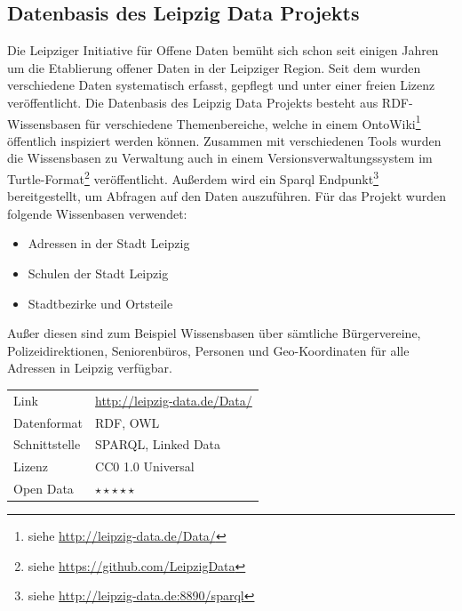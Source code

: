 \documentclass[parskip]{scrartcl}
\begin{document}
\subsection{Datenbasis des Leipzig Data Projekts }
Die Leipziger Initiative für Offene Daten bemüht sich schon seit einigen Jahren um die Etablierung offener Daten in der Leipziger Region. Seit dem wurden verschiedene Daten systematisch erfasst, gepflegt und unter einer freien Lizenz veröffentlicht. Die Datenbasis des Leipzig Data Projekts besteht aus RDF-Wissensbasen für verschiedene Themenbereiche, welche in einem OntoWiki\footnote{siehe \url{http://leipzig-data.de/Data/}} öffentlich inspiziert werden können. Zusammen mit verschiedenen Tools wurden die Wissensbasen zu Verwaltung auch in einem Versionsverwaltungssystem im Turtle-Format\footnote{siehe \url{https://github.com/LeipzigData}} veröffentlicht. Außerdem wird ein Sparql Endpunkt\footnote{siehe \url{http://leipzig-data.de:8890/sparql}} bereitgestellt, um Abfragen auf den Daten auszuführen. Für das Projekt wurden folgende Wissenbasen verwendet:
\begin{itemize}
\setlength{\itemsep}{-3pt}
\item Adressen in der Stadt Leipzig
\item Schulen der Stadt Leipzig
\item Stadtbezirke und Ortsteile
\end{itemize}
Außer diesen sind zum Beispiel Wissensbasen über sämtliche Bürgervereine, Polizeidirektionen, Seniorenbüros, Personen und Geo-Koordinaten für alle Adressen in Leipzig verfügbar.
 

\begin{tabular}{l|p{9cm}}
	Link & \url{http://leipzig-data.de/Data/} \\
 	Datenformat & RDF, OWL \\
 	Schnittstelle & SPARQL, Linked Data \\
 	Lizenz & CC0 1.0 Universal \\
 	Open Data & $\star\star\star\star\star$ \\
\end{tabular}
\end{document}
